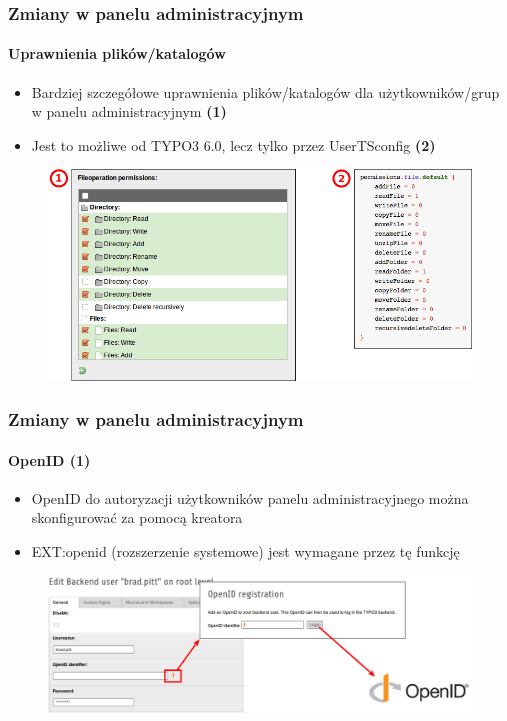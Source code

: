 
\begin{frame}[fragile]
	\frametitle{Zmiany w panelu administracyjnym}
	\framesubtitle{Uprawnienia plików/katalogów}

 	\begin{itemize}
		\item Bardziej szczegółowe uprawnienia plików/katalogów dla użytkowników/grup w panelu administracyjnym 
			\begingroup\color{typo3red}\textbf{(1)}\endgroup
		\item Jest to możliwe od TYPO3 6.0, lecz tylko przez UserTSconfig
			\begingroup\color{typo3red}\textbf{(2)}\endgroup
	\end{itemize}

	\begin{figure}
		\includegraphics[width=0.75\linewidth]{Images/BackendChanges/FileAndDirectoryPermissions.png}
	\end{figure}

\end{frame}


\begin{frame}[fragile]
	\frametitle{Zmiany w panelu administracyjnym}
	\framesubtitle{OpenID (1)}

 	\begin{itemize}
		\item OpenID do autoryzacji użytkowników panelu administracyjnego można skonfigurować za pomocą kreatora
		\item EXT:openid (rozszerzenie systemowe) jest wymagane przez tę funkcję
	\end{itemize}

	\begin{figure}
		\includegraphics[width=0.95\linewidth]{Images/BackendChanges/OpenIdWizard.png}
	\end{figure}

\end{frame}

